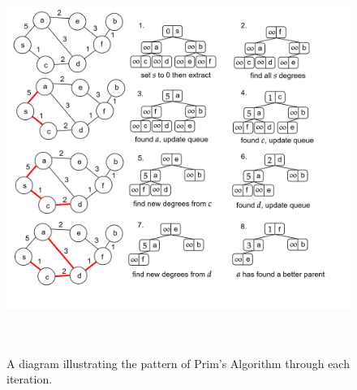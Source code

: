 \begin{figure}[h]
\centering

        




\includegraphics[height=5in]{./Sections/spanning/prims_alg.png}

        \caption{A diagram illustrating the pattern of Prim's Algorithm through each iteration.}
        \label{fig:prim_example}
    \end{figure}

\noindent
    

